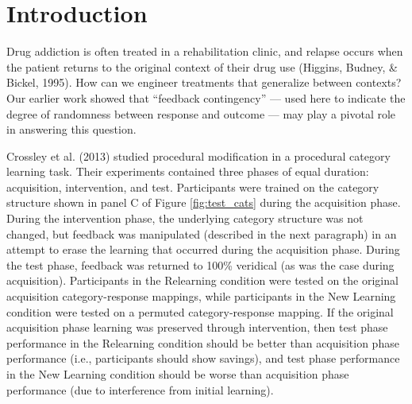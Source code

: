 \section*{Introduction}
Drug addiction is often treated in a rehabilitation clinic, and relapse occurs
when the patient returns to the original context of their drug use (Higgins,
Budney, \& Bickel, 1995). How can we engineer treatments that generalize between
contexts? Our earlier work \cite{crossley_erasing_2013} showed that
``feedback contingency'' --- used here to indicate the degree of randomness
between response and outcome --- may play a pivotal role in answering this
question.

Crossley et al. (2013) studied procedural modification in a procedural category
learning task. Their experiments contained three phases of equal duration:
acquisition, intervention, and test. Participants were trained on the category
structure shown in panel C of Figure \ref{fig:test_cats} during the acquisition
phase. During the intervention phase, the underlying category structure was not
changed, but feedback was manipulated (described in the next paragraph) in an
attempt to erase the learning that occurred during the acquisition phase. During
the test phase, feedback was returned to 100\% veridical (as was the case during
acquisition). Participants in the Relearning condition were tested on the
original acquisition category-response mappings, while participants in the New
Learning condition were tested on a permuted category-response mapping. If the original
acquisition phase learning was preserved through intervention, then test phase
performance in the Relearning condition should be better than acquisition phase
performance (i.e., participants should show savings), and test phase performance
in the New Learning condition should be worse than acquisition phase performance
(due to interference from initial learning).

